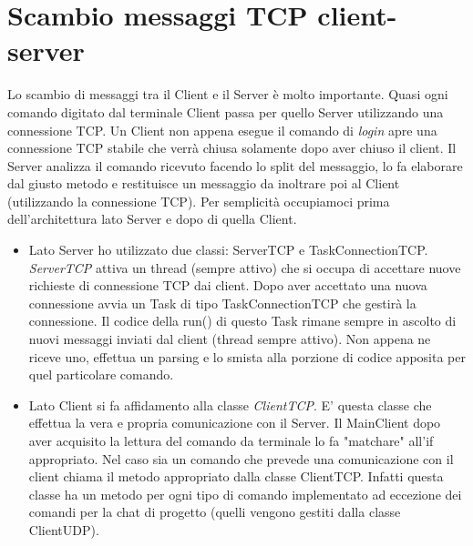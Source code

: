\documentclass{article} %
\begin{document}
\section{Scambio messaggi TCP client-server}
Lo scambio di messaggi tra il Client e il Server è molto importante.
Quasi ogni comando digitato dal terminale Client passa per quello Server utilizzando una connessione TCP. Un Client non appena esegue il comando di {\itshape login} apre una connessione TCP stabile che verrà chiusa solamente dopo aver chiuso il client. Il Server analizza il comando ricevuto facendo lo split del messaggio, lo fa elaborare dal giusto metodo e restituisce un messaggio da inoltrare poi al Client (utilizzando la connessione TCP). Per semplicità occupiamoci prima dell'architettura lato Server e dopo di quella Client.
\begin{itemize}
    \item Lato Server ho utilizzato due classi: ServerTCP e TaskConnectionTCP. {\itshape ServerTCP} attiva un thread (sempre attivo) che si occupa di accettare nuove richieste di connessione TCP dai client. Dopo aver accettato una nuova connessione avvia un Task di tipo TaskConnectionTCP che gestirà la connessione. Il codice della run() di questo Task rimane sempre in ascolto di nuovi messaggi inviati dal client (thread sempre attivo). Non appena ne riceve uno, effettua un parsing e lo smista alla porzione di codice apposita per quel particolare comando.
    \item Lato Client si fa affidamento alla classe {\itshape ClientTCP}. E' questa classe che effettua la vera e propria comunicazione con il Server. Il MainClient dopo aver acquisito la lettura del comando da terminale lo fa "matchare" all'if appropriato. Nel caso sia un comando che prevede una comunicazione con il client chiama il metodo appropriato dalla classe ClientTCP. Infatti questa classe ha un metodo per ogni tipo di comando implementato ad eccezione dei comandi per la chat di progetto (quelli vengono gestiti dalla classe ClientUDP).
\end{itemize}
\end{document}
